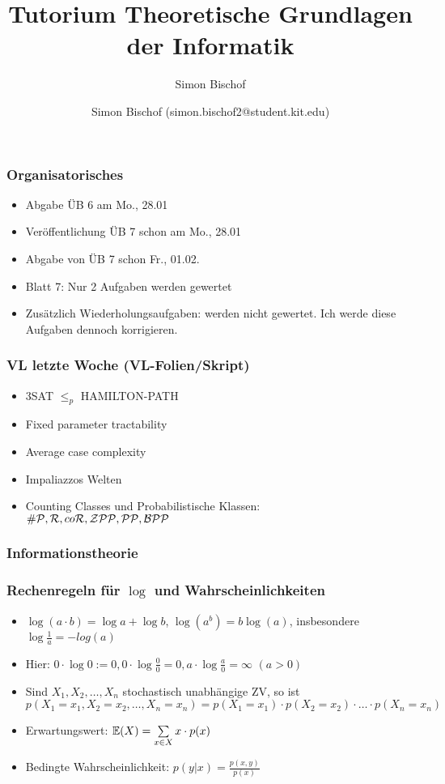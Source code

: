\documentclass{beamer}
\author{Simon Bischof (simon.bischof2@student.kit.edu)}
\title{Tutorium Theoretische Grundlagen der Informatik}
\subtitle{Simon Bischof}
\institute{Institut f\"{u}r Kryptographie und Sicherheit}
\newcommand{\E}{\ensuremath \mathbb{E}}
\renewcommand{\P}{\ensuremath \mathcal{P}}
\begin{document}
\begin{frame}
\maketitle
\end{frame}

\begin{frame}
\frametitle{Organisatorisches}
\begin{itemize}
\item Abgabe ÜB 6 am Mo., 28.01
\item Veröffentlichung ÜB 7 schon am Mo., 28.01
\item Abgabe von ÜB 7 schon Fr., 01.02.
\item Blatt 7: Nur 2 Aufgaben werden gewertet
\item Zusätzlich Wiederholungsaufgaben: werden nicht gewertet. Ich werde diese Aufgaben dennoch korrigieren.
\end{itemize}
\end{frame}

\begin{frame}
\frametitle{VL letzte Woche (VL-Folien/Skript)}
\begin{itemize}
\item 3SAT $\leq_p$ HAMILTON-PATH
\item Fixed parameter tractability
\item Average case complexity
\item Impaliazzos Welten
\item Counting Classes und Probabilistische Klassen:\\
$\#\P,\mathcal{R},co\mathcal{R},\mathcal{ZPP},\mathcal{PP},\mathcal{BPP}$ 
\end{itemize}
\end{frame}

\begin{frame}
\frametitle{Informationstheorie}
\end{frame}

\begin{frame}
\frametitle{Rechenregeln für $\log$ und Wahrscheinlichkeiten}
\begin{itemize}
\item $\log(a\cdot b)=\log a+\log b$, $\log(a^b)=b\log(a)$, insbesondere $\log\frac{1}{a}=-log(a)$
\item Hier: $0\cdot\log 0:=0,0\cdot\log \frac{0}{0}=0,a\cdot\log \frac{a}{0}=\infty$ $(a>0)$\pause
\item Sind $X_1,X_2,\ldots,X_n$ stochastisch unabhängige ZV, so ist\\
$p(X_1=x_1,X_2=x_2,\ldots,X_n=x_n)=p(X_1=x_1)\cdot p(X_2=x_2)\cdot \ldots\cdot p(X_n=x_n)$
\item Erwartungswert: $\E(X)=\sum\limits_{x\in X}x\cdot p(x)$\pause
\item Bedingte Wahrscheinlichkeit: $p(y|x)=\frac{p(x,y)}{p(x)}$
\end{itemize}
\end{frame}
\end{document}
